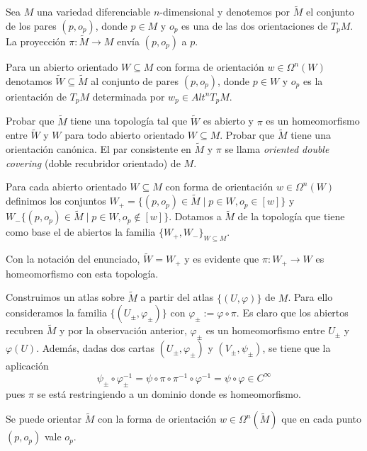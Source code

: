\documentclass[twoside]{article}
\begin{document}
\begin{ejercicio}{9.15}
Sea $M$ una variedad diferenciable $n$-dimensional y denotemos por $\widetilde{M}$ el conjunto de los pares $(p, o_p)$, donde $p\in M$ y $o_p$ es una de las dos orientaciones de $T_pM$. La proyección $\pi:\widetilde{M}\to M$ envía $(p,o_p)$ a $p$. 

Para un abierto orientado $W\subseteq M$ con forma de orientación $w\in\Omega^n(W)$ denotamos $\widetilde{W}\subseteq\widetilde{M}$ al conjunto de pares $(p,o_p)$, donde $p\in W$ y $o_p$ es la orientación de $T_pM$ determinada por $w_p\in Alt^n T_pM$.

Probar que $\widetilde{M}$ tiene una topología tal que $\widetilde{W}$ es abierto y $\pi$ es un homeomorfismo entre $\widetilde{W}$ y $W$ para todo abierto orientado $W\subseteq M$. Probar que $\widetilde{M}$ tiene una orientación canónica. El par consistente en $\widetilde{M}$ y $\pi$ se llama \emph{oriented double covering} (doble recubridor orientado) de $M$.
\end{ejercicio}
\begin{solucion}
Para cada abierto orientado $W\subseteq M$ con forma de orientación $w\in\Omega^n(W)$ definimos los conjuntos $W_+=\{(p,o_p)\in\widetilde{M}\mid p\in W, o_p\in [w]\}$ y $W_-\{(p,o_p)\in\widetilde{M}\mid p\in W, o_p\notin[w]\}$. Dotamos a $\widetilde{M}$ de la topología que tiene como base el de abiertos la familia $\{W_+,W_-\}_{W\subseteq M}$.


 Con la notación del enunciado, $\widetilde{W}=W_+$ y es evidente que $\pi:W_+\to W$ es homeomorfismo con esta topología.

Construimos un atlas sobre $\widetilde{M}$ a partir del atlas $\{(U,\varphi)\}$ de $M$. Para ello consideramos la familia $\{(U_\pm, \varphi_\pm)\}$ con $\varphi_\pm:=\varphi\circ\pi$. Es claro que los abiertos recubren $\widetilde{M}$ y por la observación anterior, $\varphi_\pm$ es un homeomorfismo entre $U_\pm$ y $\varphi(U)$. Además, dadas dos cartas $(U_\pm,\varphi_\pm)$ y $(V_\pm,\psi_\pm)$, se tiene que la aplicación
\[
\psi_\pm\circ \varphi_\pm^{-1}=\psi\circ\pi\circ\pi^{-1}\circ\varphi^{-1}=\psi\circ\varphi\in C^{\infty}
\]
pues $\pi$ se está restringiendo a un dominio donde es homeomorfismo.

Se puede orientar $\widetilde{M}$ con la forma de orientación $w\in\Omega^n(\widetilde{M})$ que en cada punto $(p,o_p)$ vale $o_p$. 


\end{solucion}
\newpage
\end{document}
